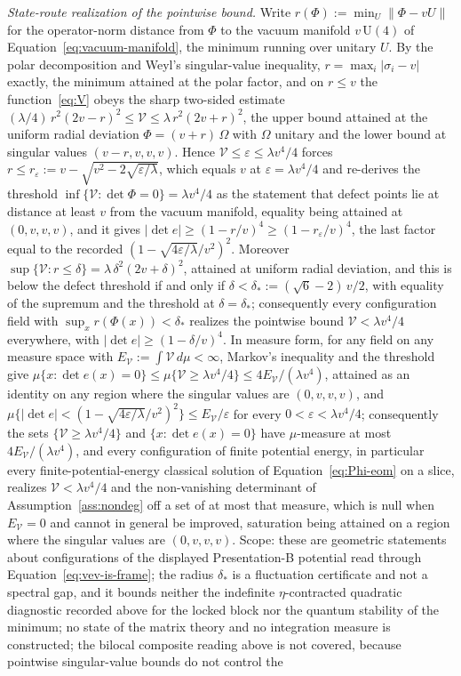 \emph{State-route realization of the pointwise bound.} Write \(r(\Phi):=\min_{U}\|\Phi-vU\|\) for the operator-norm distance from \(\Phi\) to the vacuum manifold \(v\,\mathrm U(4)\) of Equation~\eqref{eq:vacuum-manifold}, the minimum running over unitary \(U\). By the polar decomposition and Weyl's singular-value inequality, \(r=\max_i|\sigma_i-v|\) exactly, the minimum attained at the polar factor, and on \(r\le v\) the function~\eqref{eq:V} obeys the sharp two-sided estimate \((\lambda/4)\,r^2(2v-r)^2\le\mathcal V\le\lambda\,r^2(2v+r)^2\), the upper bound attained at the uniform radial deviation \(\Phi=(v+r)\,\Omega\) with \(\Omega\) unitary and the lower bound at singular values \((v-r,v,v,v)\). Hence \(\mathcal V\le\varepsilon\le\lambda v^4/4\) forces \(r\le r_\varepsilon:=v-\sqrt{v^2-2\sqrt{\varepsilon/\lambda}}\), which equals \(v\) at \(\varepsilon=\lambda v^4/4\) and re-derives the threshold \(\inf\{\mathcal V:\det\Phi=0\}=\lambda v^4/4\) as the statement that defect points lie at distance at least \(v\) from the vacuum manifold, equality being attained at \((0,v,v,v)\), and it gives \(|\det e|\ge(1-r/v)^4\ge(1-r_\varepsilon/v)^4\), the last factor equal to the recorded \((1-\sqrt{4\varepsilon/\lambda}/v^2)^2\). Moreover \(\sup\{\mathcal V:r\le\delta\}=\lambda\,\delta^2(2v+\delta)^2\), attained at uniform radial deviation, and this is below the defect threshold if and only if \(\delta<\delta_*:=(\sqrt{6}-2)\,v/2\), with equality of the supremum and the threshold at \(\delta=\delta_*\); consequently every configuration field with \(\sup_x r(\Phi(x))<\delta_*\) realizes the pointwise bound \(\mathcal V<\lambda v^4/4\) everywhere, with \(|\det e|\ge(1-\delta/v)^4\). In measure form, for any field on any measure space with \(E_{\mathcal V}:=\int\mathcal V\,d\mu<\infty\), Markov's inequality and the threshold give \(\mu\{x:\det e(x)=0\}\le\mu\{\mathcal V\ge\lambda v^4/4\}\le 4E_{\mathcal V}/(\lambda v^4)\), attained as an identity on any region where the singular values are \((0,v,v,v)\), and \(\mu\{|\det e|<(1-\sqrt{4\varepsilon/\lambda}/v^2)^2\}\le E_{\mathcal V}/\varepsilon\) for every \(0<\varepsilon<\lambda v^4/4\); consequently the sets \(\{\mathcal V\ge\lambda v^4/4\}\) and \(\{x:\det e(x)=0\}\) have \(\mu\)-measure at most \(4E_{\mathcal V}/(\lambda v^4)\), and every configuration of finite potential energy, in particular every finite-potential-energy classical solution of Equation~\eqref{eq:Phi-eom} on a slice, realizes \(\mathcal V<\lambda v^4/4\) and the non-vanishing determinant of Assumption~\ref{ass:nondeg} off a set of at most that measure, which is null when \(E_{\mathcal V}=0\) and cannot in general be improved, saturation being attained on a region where the singular values are \((0,v,v,v)\). Scope: these are geometric statements about configurations of the displayed Presentation-B potential read through Equation~\eqref{eq:vev-is-frame}; the radius \(\delta_*\) is a fluctuation certificate and not a spectral gap, and it bounds neither the indefinite \(\eta\)-contracted quadratic diagnostic recorded above for the locked block nor the quantum stability of the minimum; no state of the matrix theory and no integration measure is constructed; the bilocal composite reading above is not covered, because pointwise singular-value bounds do not control the 